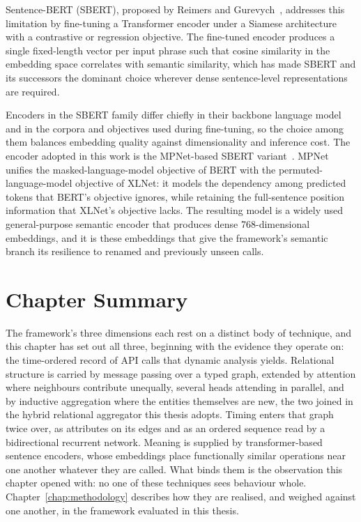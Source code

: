 \documentclass[%
    BCOR=10mm,
    DIV=13,
    toc=bibliography,
    toc=listof,
    oneside,
    12pt,
]{scrbook}
\begin{document}
Sentence-BERT (SBERT), proposed by Reimers and Gurevych~\cite{reimers2019sbert},
addresses this limitation by fine-tuning a Transformer encoder under a Siamese
architecture with a contrastive or regression objective. The fine-tuned encoder
produces a single fixed-length vector per input phrase such that cosine similarity
in the embedding space correlates with semantic similarity, which has made SBERT
and its successors the dominant choice wherever dense sentence-level
representations are required.

Encoders in the SBERT family differ chiefly in their backbone language model and
in the corpora and objectives used during fine-tuning, so the choice among them
balances embedding quality against dimensionality and inference cost. The
encoder adopted in this work is the MPNet-based SBERT
variant~\cite{mpnet2020}. MPNet unifies the masked-language-model objective of
BERT with the permuted-language-model objective of XLNet: it models the
dependency among predicted tokens that BERT's objective ignores, while
retaining the full-sentence position information that XLNet's objective lacks.
The resulting model is a widely used general-purpose semantic encoder that
produces dense 768-dimensional embeddings, and it is these embeddings that give
the framework's semantic branch its resilience to renamed and previously unseen
calls.

\section{Chapter Summary}
\label{sec:theory_summary}

The framework's three dimensions each rest on a distinct body of technique, and
this chapter has set out all three, beginning with the evidence they operate on:
the time-ordered record of API calls that dynamic analysis yields. Relational
structure is carried by message passing over a typed graph, extended by
attention where neighbours contribute
unequally, several heads attending in parallel, and by inductive aggregation
where the entities themselves are new, the two joined in the hybrid relational
aggregator this thesis adopts. Timing enters that graph twice over, as
attributes on its edges and as an ordered sequence read by a bidirectional
recurrent network. Meaning is supplied by transformer-based sentence encoders,
whose embeddings place functionally similar operations near one another
whatever they are called. What binds them is the observation this chapter
opened with: no one of these techniques sees behaviour whole.
Chapter~\ref{chap:methodology} describes how they are realised, and weighed
against one another, in the framework evaluated in this thesis.
\end{document}
